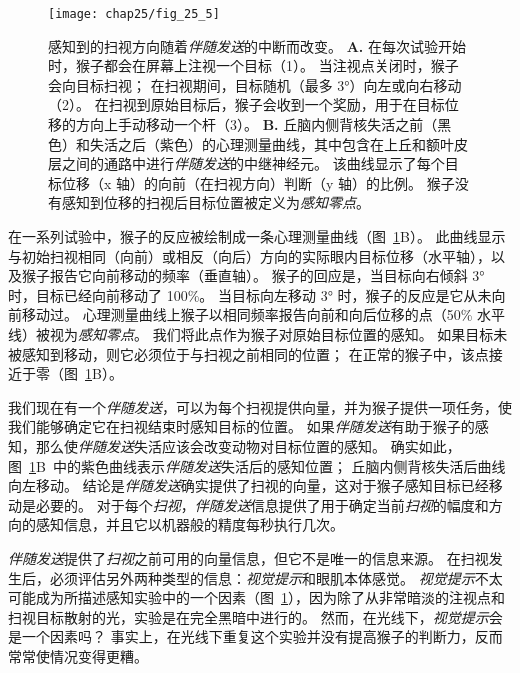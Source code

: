 \begin{figure}[htbp]
	\centering
	\texttt{[image: chap25/fig\_25\_5]}
	\caption{感知到的扫视方向随着\textit{伴随发送}的中断而改变。
		\textbf{A.} 在每次试验开始时，猴子都会在屏幕上注视一个目标（1）。
		当注视点关闭时，猴子会向目标扫视；
		在扫视期间，目标随机（最多 3°）向左或向右移动（2）。
		在扫视到原始目标后，猴子会收到一个奖励，用于在目标位移的方向上手动移动一个杆（3）。
		\textbf{B.} 丘脑内侧背核失活之前（黑色）和失活之后（紫色）的心理测量曲线，其中包含在上丘和额叶皮层之间的通路中进行\textit{伴随发送}的中继神经元。
		该曲线显示了每个目标位移（x 轴）的向前（在扫视方向）判断（y 轴）的比例。
		猴子没有感知到位移的扫视后目标位置被定义为\textit{感知零点}\cite{cavanaugh2016saccadic}。}
	\label{fig:25_5}
\end{figure}


在一系列试验中，猴子的反应被绘制成一条心理测量曲线（图~\ref{fig:25_5}B）。
此曲线显示与初始扫视相同（向前）或相反（向后）方向的实际眼内目标位移（水平轴），以及猴子报告它向前移动的频率（垂直轴）。
猴子的回应是，当目标向右倾斜 3° 时，目标已经向前移动了 100\%。
当目标向左移动 3° 时，猴子的反应是它从未向前移动过。
心理测量曲线上猴子以相同频率报告向前和向后位移的点（50\% 水平线）被视为\textit{感知零点}。
我们将此点作为猴子对原始目标位置的感知。
如果目标未被感知到移动，则它必须位于与扫视之前相同的位置；
在正常的猴子中，该点接近于零（图~\ref{fig:25_5}B）。


我们现在有一个\textit{伴随发送}，可以为每个扫视提供向量，并为猴子提供一项任务，使我们能够确定它在扫视结束时感知目标的位置。
如果\textit{伴随发送}有助于猴子的感知，那么使\textit{伴随发送}失活应该会改变动物对目标位置的感知。
确实如此，图~\ref{fig:25_5}B~中的紫色曲线表示\textit{伴随发送}失活后的感知位置；
丘脑内侧背核失活后曲线向左移动。
结论是\textit{伴随发送}确实提供了扫视的向量，这对于猴子感知目标已经移动是必要的。
对于每个\textit{扫视}，\textit{伴随发送}信息提供了用于确定当前\textit{扫视}的幅度和方向的感知信息，并且它以机器般的精度每秒执行几次。


\textit{伴随发送}提供了\textit{扫视}之前可用的向量信息，但它不是唯一的信息来源。
在扫视发生后，必须评估另外两种类型的信息：\textit{视觉提示}和眼肌本体感觉。
\textit{视觉提示}不太可能成为所描述感知实验中的一个因素（图~\ref{fig:25_5}），因为除了从非常暗淡的注视点和扫视目标散射的光，实验是在完全黑暗中进行的。
然而，在光线下，\textit{视觉提示}会是一个因素吗？
事实上，在光线下重复这个实验并没有提高猴子的判断力，反而常常使情况变得更糟。


